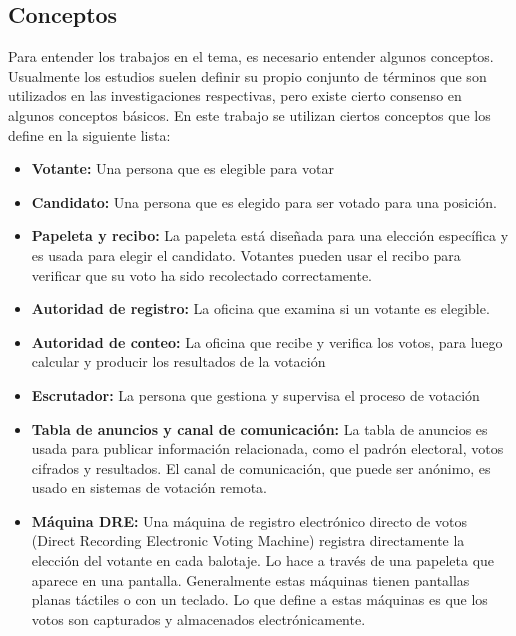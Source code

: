 \newpage
\subsection{Conceptos}

Para entender los trabajos en el tema, es necesario entender algunos
conceptos. Usualmente los estudios suelen definir su propio conjunto de términos
que son utilizados en las investigaciones respectivas, pero existe cierto consenso
en algunos conceptos básicos. En este trabajo se utilizan ciertos conceptos que 
\cite{Yumeng2012,Goodman2012} los define en la siguiente lista:

\begin{itemize}
	\item \textbf{Votante:} Una persona que es elegible para votar
	
	\item \textbf{Candidato:} Una persona que es elegido para ser votado para una posición.
	
	\item \textbf{Papeleta y recibo:} La papeleta está diseñada para una elección 
	específica y es usada para elegir el candidato. Votantes pueden 
	usar el recibo para verificar que su voto ha sido recolectado correctamente.
	
	\item \textbf{Autoridad de registro:} La oficina que examina si un votante es elegible.
	
	\item \textbf{Autoridad de conteo:} La oficina que recibe y verifica los 
	votos, para luego calcular y producir los resultados de la votación
	
	\item \textbf{Escrutador:} La persona que gestiona y supervisa el proceso de votación
	
	\item \textbf{Tabla de anuncios y canal de comunicación:} La tabla 
	de anuncios es usada para publicar información relacionada, como el 
	padrón electoral, votos cifrados y resultados. El canal de comunicación, 
	que puede ser anónimo, es usado en sistemas de votación remota.
	
	\item \textbf{Máquina DRE:} Una máquina de registro electrónico directo de votos (Direct Recording Electronic Voting Machine)
		registra directamente la elección del votante en cada balotaje. Lo hace a través de una papeleta
		que aparece en una pantalla. Generalmente estas máquinas tienen pantallas planas táctiles o 
		con un teclado. Lo que define a estas máquinas es que los votos son capturados y almacenados
		electrónicamente.
		
\end{itemize}
		
